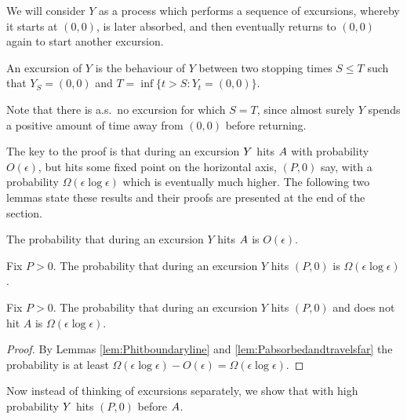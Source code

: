 {\newcommand{\farpoint}{(P,0)}
\newcommand{\origin}{(0,0)}

We will consider $Y$ as a process which performs a sequence of
excursions, whereby it starts at $\origin$, is later absorbed, and
then eventually returns to $\origin$ again to start another excursion.

\begin{definition}
  An excursion of $Y$ is the behaviour of $Y$ between two stopping times
  $S \le T$ such that $Y_S =
  \origin$ and $T = \inf\{ t > S : Y_t = \origin \}$.
\end{definition}

Note that there is a.s.\ no excursion for which $S = T$, since almost
surely $Y$ spends a positive amount of time away from $\origin$ before
returning.

\newcommand{\Omegaeloge}{\Omega(\epsilon\log\epsilon)}

The key to the proof is that during an excursion $Y$ hits
$A$ with probability $O(\epsilon)$, but hits some fixed
point on the horizontal axis, $\farpoint$ say, with a probability
$\Omegaeloge$ which is eventually much higher.  The following two
lemmas state these results and their proofs are presented at the end
of the section.

\begin{lemma}
  \label{lem:Phitboundaryline}
  The probability that during an excursion $Y$ hits $A$
  is $O(\epsilon)$.
\end{lemma}

\begin{lemma}
  \label{lem:Pabsorbedandtravelsfar}
  Fix $P > 0$.  The probability that during an excursion $Y$ hits $\farpoint$
  is $\Omegaeloge$.
\end{lemma}

\begin{lemma}
  Fix $P > 0$.  The probability that during an excursion $Y$ hits $\farpoint$
  and does not hit $A$ is $\Omegaeloge$.
\end{lemma}

\begin{proof}
  By Lemmas \ref{lem:Phitboundaryline} and
  \ref{lem:Pabsorbedandtravelsfar} the probability is at least
  $\Omegaeloge - O(\epsilon) = \Omegaeloge$.
\end{proof}

Now instead of thinking of excursions separately, we show that with
high probability $Y$ hits $\farpoint$ before $A$.

}

